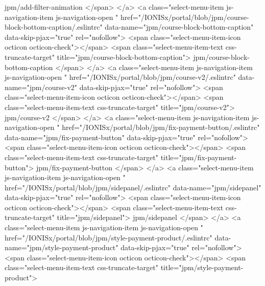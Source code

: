                 jpm/add-filter-animation
              </span>
            </a>
            <a class="select-menu-item js-navigation-item js-navigation-open "
               href="/IONISx/portal/blob/jpm/course-block-bottom-caption/.eslintrc"
               data-name="jpm/course-block-bottom-caption"
               data-skip-pjax="true"
               rel="nofollow">
              <span class="select-menu-item-icon octicon octicon-check"></span>
              <span class="select-menu-item-text css-truncate-target" title="jpm/course-block-bottom-caption">
                jpm/course-block-bottom-caption
              </span>
            </a>
            <a class="select-menu-item js-navigation-item js-navigation-open "
               href="/IONISx/portal/blob/jpm/course-v2/.eslintrc"
               data-name="jpm/course-v2"
               data-skip-pjax="true"
               rel="nofollow">
              <span class="select-menu-item-icon octicon octicon-check"></span>
              <span class="select-menu-item-text css-truncate-target" title="jpm/course-v2">
                jpm/course-v2
              </span>
            </a>
            <a class="select-menu-item js-navigation-item js-navigation-open "
               href="/IONISx/portal/blob/jpm/fix-payment-button/.eslintrc"
               data-name="jpm/fix-payment-button"
               data-skip-pjax="true"
               rel="nofollow">
              <span class="select-menu-item-icon octicon octicon-check"></span>
              <span class="select-menu-item-text css-truncate-target" title="jpm/fix-payment-button">
                jpm/fix-payment-button
              </span>
            </a>
            <a class="select-menu-item js-navigation-item js-navigation-open "
               href="/IONISx/portal/blob/jpm/sidepanel/.eslintrc"
               data-name="jpm/sidepanel"
               data-skip-pjax="true"
               rel="nofollow">
              <span class="select-menu-item-icon octicon octicon-check"></span>
              <span class="select-menu-item-text css-truncate-target" title="jpm/sidepanel">
                jpm/sidepanel
              </span>
            </a>
            <a class="select-menu-item js-navigation-item js-navigation-open "
               href="/IONISx/portal/blob/jpm/style-payment-product/.eslintrc"
               data-name="jpm/style-payment-product"
               data-skip-pjax="true"
               rel="nofollow">
              <span class="select-menu-item-icon octicon octicon-check"></span>
              <span class="select-menu-item-text css-truncate-target" title="jpm/style-payment-product">
